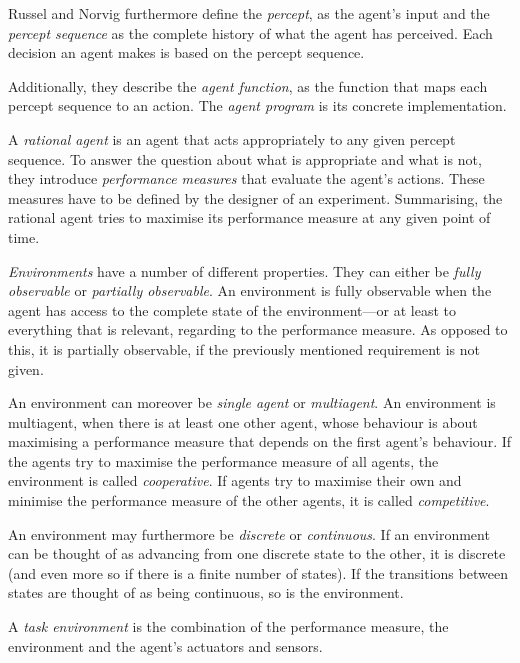 Russel and Norvig furthermore define the \emph{percept}, as the agent's input and the \emph{percept sequence} as the complete history of what the agent has perceived. Each decision an agent makes is based on the percept sequence.

Additionally, they describe the \emph{agent function}, as the function that maps each percept sequence to an action. The \emph{agent program} is its concrete implementation.

A \emph{rational agent} is an agent that acts appropriately to any given percept sequence. To answer the question about what is appropriate and what is not, they introduce \emph{performance measures} that evaluate the agent's actions. These measures have to be defined by the designer of an experiment. Summarising, the rational agent tries to maximise its performance measure at any given point of time.


\emph{Environments} have a number of different properties. They can either be \emph{fully observable} or \emph{partially observable}. An environment is fully observable when the agent has access to the complete state of the environment---or at least to everything that is relevant, regarding to the performance measure. As opposed to this, it is partially observable, if the previously mentioned requirement is not given.

An environment can moreover be \emph{single agent} or \emph{multiagent}. An environment is multiagent, when there is at least one other agent, whose behaviour is about maximising a performance measure that depends on the first agent's behaviour. If the agents try to maximise the performance measure of all agents, the environment is called \emph{cooperative}. If agents try to maximise their own and minimise the performance measure of the other agents, it is called \emph{competitive}.

An environment may furthermore be \emph{discrete} or \emph{continuous}. If an environment can be thought of as advancing from one discrete state to the other, it is discrete (and even more so if there is a finite number of states). If the transitions between states are thought of as being continuous, so is the environment.

A \emph{task environment} is the combination of the performance measure, the environment and the agent's actuators and sensors.

